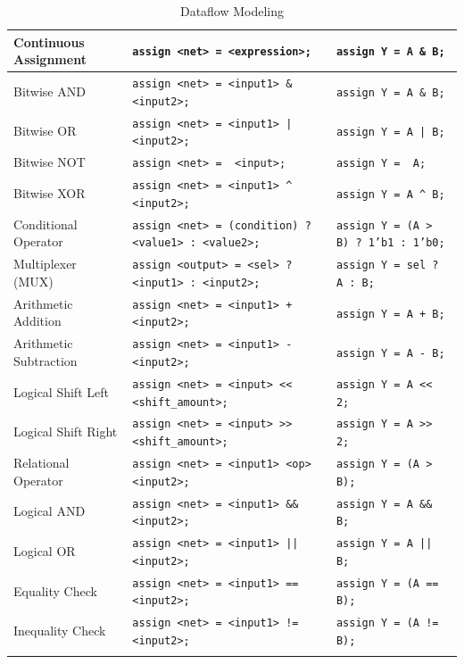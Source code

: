 \documentclass[12pt]{journal}
\begin{document}
\begin{longtable}{|>{\centering\arraybackslash}m{4cm}|>{\centering\arraybackslash}m{6cm}|>{\centering\arraybackslash}m{4cm}|}
Continuous Assignment & \texttt{assign <net> = <expression>;} & \texttt{assign Y = A \& B;} \\ 
\hline
Bitwise AND & \texttt{assign <net> = <input1> \& <input2>;} & \texttt{assign Y = A \& B;} \\ 
\hline
Bitwise OR & \texttt{assign <net> = <input1> | <input2>;} & \texttt{assign Y = A | B;} \\
\hline
Bitwise NOT & \texttt{assign <net> = ~<input>;} & \texttt{assign Y = ~A;} \\
\hline
Bitwise XOR & \texttt{assign <net> = <input1> \^{} <input2>;} & \texttt{assign Y = A \^{} B;} \\
\hline
Conditional Operator & \texttt{assign <net> = (condition) ? <value1> : <value2>;} & \texttt{assign Y = (A > B) ? 1'b1 : 1'b0;} \\
\hline
Multiplexer (MUX) & \texttt{assign <output> = <sel> ? <input1> : <input2>;} & \texttt{assign Y = sel ? A : B;} \\
\hline
Arithmetic Addition & \texttt{assign <net> = <input1> + <input2>;} & \texttt{assign Y = A + B;} \\
\hline
Arithmetic Subtraction & \texttt{assign <net> = <input1> - <input2>;} & \texttt{assign Y = A - B;} \\
\hline
Logical Shift Left & \texttt{assign <net> = <input> << <shift\_amount>;} & \texttt{assign Y = A << 2;} \\
\hline
Logical Shift Right & \texttt{assign <net> = <input> >> <shift\_amount>;} & \texttt{assign Y = A >> 2;} \\
\hline
Relational Operator & \texttt{assign <net> = <input1> <op> <input2>;} & \texttt{assign Y = (A > B);} \\
\hline
Logical AND & \texttt{assign <net> = <input1> \&\& <input2>;} & \texttt{assign Y = A \&\& B;} \\
\hline
Logical OR & \texttt{assign <net> = <input1> || <input2>;} & \texttt{assign Y = A || B;} \\
\hline
Equality Check & \texttt{assign <net> = <input1> == <input2>;} & \texttt{assign Y = (A == B);} \\
\hline
Inequality Check & \texttt{assign <net> = <input1> != <input2>;} & \texttt{assign Y = (A != B);} \\
\hline
\caption{Dataflow Modeling}
\label{tab:dataflow}
\end{longtable}
\end{document}
